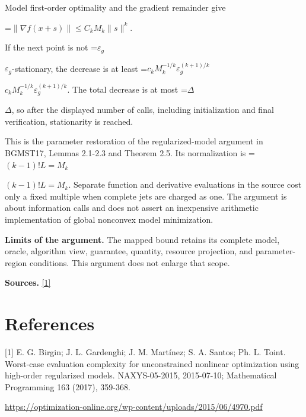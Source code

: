 \documentclass[10pt,a4paper]{article}
\newcommand{\AtlasMath}[1]{\par\begingroup\centering\setbox0=\hbox{$\displaystyle #1$}\ifdim\wd0>1.4\linewidth\typeout{ATLAS WIDE FORMULA: \the\wd0}\fi\ifdim\wd0>\linewidth\resizebox{\linewidth}{!}{\box0}\else\box0\fi\par\endgroup}
\newcommand{\AtlasInlineMath}[1]{\begingroup\setbox0=\hbox{$#1$}\ifdim\wd0>.4\linewidth\endgroup\AtlasMath{#1}\else\endgroup$#1$\fi}
\begin{document}
Model first-order optimality and the gradient remainder give

\AtlasMath{\|\nabla f(x+s)\|\le C_kM_k\|s\|^k.}

If the next point is not \AtlasInlineMath{\varepsilon_g}-stationary, the decrease is at least \AtlasInlineMath{c_kM_k^{-1/k}\varepsilon_g^{(k+1)/k}}. The total decrease is at most \AtlasInlineMath{\Delta}, so after the displayed number of calls, including initialization and final verification, stationarity is reached.

This is the parameter restoration of the regularized-model argument in BGMST17, Lemmas 2.1-2.3 and Theorem 2.5. Its normalization is \AtlasInlineMath{(k-1)!L=M_k}. Separate function and derivative evaluations in the source cost only a fixed multiple when complete jets are charged as one. The argument is about information calls and does not assert an inexpensive arithmetic implementation of global nonconvex model minimization.

\textbf{Limits of the argument.} The mapped bound retains its complete model, oracle, algorithm view, guarantee, quantity, resource projection, and parameter-region conditions. This argument does not enlarge that scope.

\textbf{Sources.} \href{https://optimization-online.org/wp-content/uploads/2015/06/4970.pdf}{[1]}

\section{References}
[1] E. G. Birgin; J. L. Gardenghi; J. M. Martínez; S. A. Santos; Ph. L. Toint. Worst-case evaluation complexity for unconstrained nonlinear optimization using high-order regularized models. NAXYS-05-2015, 2015-07-10; Mathematical Programming 163 (2017), 359-368.

\url{https://optimization-online.org/wp-content/uploads/2015/06/4970.pdf}
\end{document}
